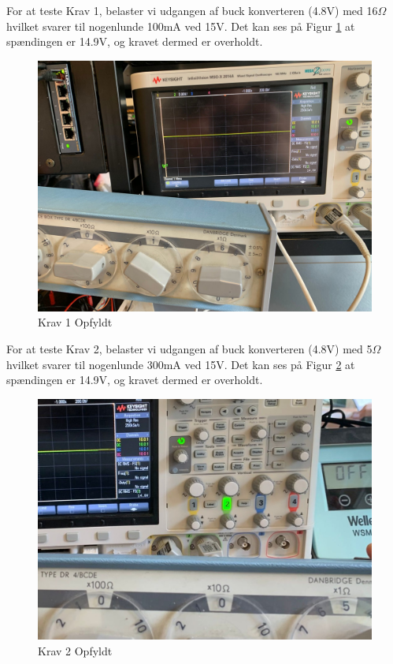 \documentclass[../main.tex]{subfiles}
\begin{document}
For at teste Krav 1, belaster vi udgangen af buck konverteren (4.8V) med 16$\Omega$ hvilket svarer til nogenlunde 100mA ved 15V. Det kan ses på Figur \ref{fig: Krav 1 Opfyldt} at spændingen er 14.9V, og kravet dermed er overholdt.
\begin{figure}[H]
      \includegraphics[width=\textwidth]{Dokumentation/Pictures/Krav1.jpg}
     \caption{Krav 1 Opfyldt}
     \label{fig: Krav 1 Opfyldt}
\end{figure}

For at teste Krav 2, belaster vi udgangen af buck konverteren (4.8V) med 5$\Omega$ hvilket svarer til nogenlunde 300mA ved 15V. Det kan ses på Figur \ref{fig: Krav 2 Opfyldt} at spændingen er 14.9V, og kravet dermed er overholdt.
\begin{figure}[H]
      \includegraphics[width=\textwidth]{Dokumentation/Pictures/Krav2.jpg}
     \caption{Krav 2 Opfyldt}
     \label{fig: Krav 2 Opfyldt}
\end{figure}
\end{document}
